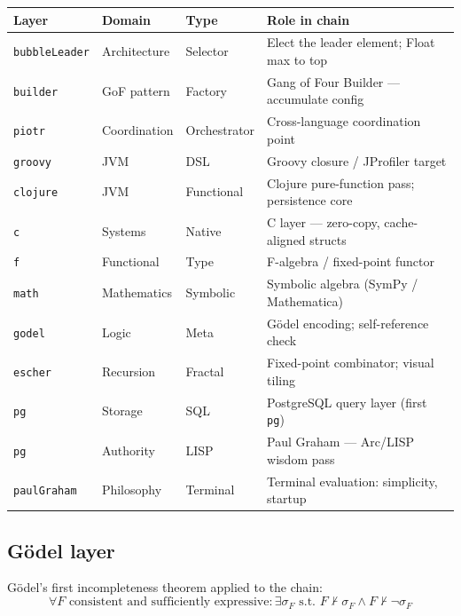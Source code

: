 \documentclass[12pt,a4paper]{article}
\begin{document}
\begin{center}
\begin{tabular}{@{}lllp{6cm}@{}}
\toprule
\textbf{Layer} & \textbf{Domain} & \textbf{Type} & \textbf{Role in chain}\\
\midrule
\texttt{bubbleLeader}  & Architecture & Selector   & Elect the leader element; Float max to top \\
\texttt{builder}       & GoF pattern  & Factory    & Gang of Four Builder — accumulate config \\
\texttt{piotr}         & Coordination & Orchestrator & Cross-language coordination point \\
\texttt{groovy}        & JVM          & DSL        & Groovy closure / JProfiler target \\
\texttt{clojure}       & JVM          & Functional & Clojure pure-function pass; persistence core \\
\texttt{c}             & Systems      & Native     & C layer — zero-copy, cache-aligned structs \\
\texttt{f}             & Functional   & Type       & F-algebra / fixed-point functor \\
\texttt{math}          & Mathematics  & Symbolic   & Symbolic algebra (SymPy / Mathematica) \\
\texttt{godel}         & Logic        & Meta       & Gödel encoding; self-reference check \\
\texttt{escher}        & Recursion    & Fractal    & Fixed-point combinator; visual tiling \\
\texttt{pg}            & Storage      & SQL        & PostgreSQL query layer (first \texttt{pg}) \\
\texttt{pg}            & Authority    & LISP       & Paul Graham — Arc/LISP wisdom pass \\
\texttt{paulGraham}    & Philosophy   & Terminal   & Terminal evaluation: simplicity, startup \\
\bottomrule
\end{tabular}
\end{center}

\subsection{Gödel layer}

Gödel's first incompleteness theorem applied to the chain:
\[
  \forall F \text{ consistent and sufficiently expressive}:
  \exists \sigma_F \text{ s.t. } F \not\vdash \sigma_F \land F \not\vdash \neg\sigma_F
\]
\end{document}
